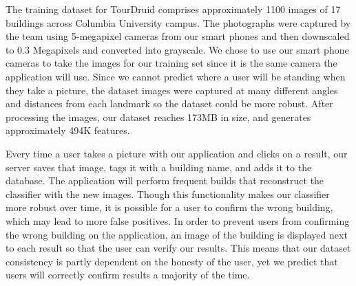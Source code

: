 The training dataset for TourDruid comprises approximately 1100 images of 17 buildings across Columbia University campus. The photographs were captured by the team using 5-megapixel cameras from our smart phones and then downscaled to 0.3 Megapixels and converted into grayscale. We chose to use our smart phone cameras to take the images for our training set since it is the same camera the application will use. Since we cannot predict where a user will be standing when they take a picture, the dataset images were captured at many different angles and distances from each landmark so the dataset could be more robust. After processing the images, our dataset reaches 173MB in size, and generates approximately 494K features.

Every time a user takes a picture with our application and clicks on a result, our server saves that image, tags it with a building name, and adds it to the database. The application will perform frequent builds that reconstruct the classifier with the new images. Though this functionality makes our classifier more robust over time, it is possible for a user to confirm the wrong building, which may lead to more false positives. In order to prevent users from confirming the wrong building on the application, an image of the building is displayed next to each result so that the user can verify our results. This means that our dataset consistency is partly dependent on the honesty of the user, yet we predict that users will correctly confirm results a majority of the time.